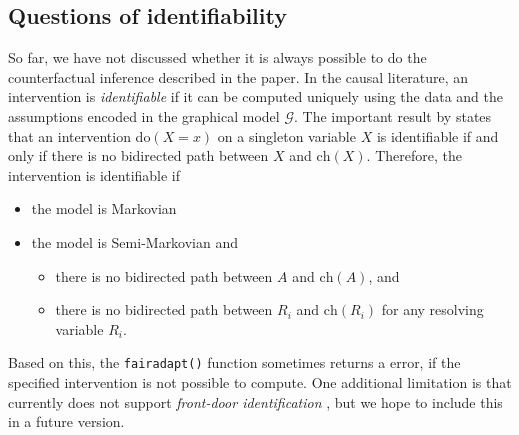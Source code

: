 \documentclass[
  notitle]{jss}
\providecommand{\tightlist}{%
  \setlength{\itemsep}{0pt}\setlength{\parskip}{0pt}}
\begin{document}
\hypertarget{questions-of-identifiability}{%
\subsection{Questions of
identifiability}\label{questions-of-identifiability}}

So far, we have not discussed whether it is always possible to do the
counterfactual inference described in the paper. In the causal
literature, an intervention is \textit{identifiable} if it can be
computed uniquely using the data and the assumptions encoded in the
graphical model \(\mathcal{G}\). The important result by
\cite{tian2002general} states that an intervention do\((X = x)\) on a
singleton variable \(X\) is identifiable if and only if there is no
bidirected path between \(X\) and \(\mathrm{ch}(X)\). Therefore, the
intervention is identifiable if

\begin{itemize}
\tightlist
\item
  the model is Markovian
\item
  the model is Semi-Markovian and

  \begin{itemize}
  \tightlist
  \item
    there is no bidirected path between \(A\) and \(\mathrm{ch}(A)\),
    and
  \item
    there is no bidirected path between \(R_i\) and \(\mathrm{ch}(R_i)\)
    for any resolving variable \(R_i\).
  \end{itemize}
\end{itemize}

Based on this, the \texttt{fairadapt()} function sometimes returns a
error, if the specified intervention is not possible to compute. One
additional limitation is that  currently does not support
\textit{front-door identification} \citep[Chapter~3]{pearl2009}, but we
hope to include this in a future version.


\end{document}
